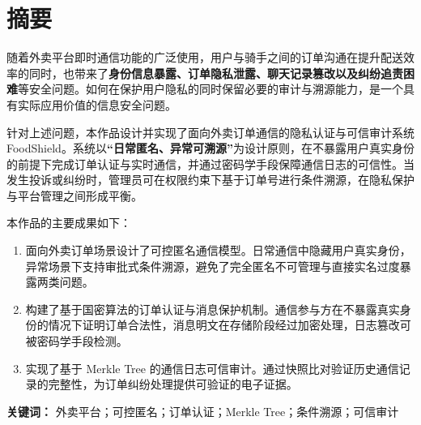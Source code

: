 \section*{摘要}

随着外卖平台即时通信功能的广泛使用，用户与骑手之间的订单沟通在提升配送效率的同时，也带来了\textbf{身份信息暴露、订单隐私泄露、聊天记录篡改以及纠纷追责困难}等安全问题。如何在保护用户隐私的同时保留必要的审计与溯源能力，是一个具有实际应用价值的信息安全问题。

针对上述问题，本作品设计并实现了面向外卖订单通信的隐私认证与可信审计系统 FoodShield。系统以\textbf{“日常匿名、异常可溯源”}为设计原则，在不暴露用户真实身份的前提下完成订单认证与实时通信，并通过密码学手段保障通信日志的可信性。当发生投诉或纠纷时，管理员可在权限约束下基于订单号进行条件溯源，在隐私保护与平台管理之间形成平衡。

本作品的主要成果如下：

\begin{enumerate}[leftmargin=2.5em, itemsep=0pt]
\item 面向外卖订单场景设计了可控匿名通信模型。日常通信中隐藏用户真实身份，异常场景下支持审批式条件溯源，避免了完全匿名不可管理与直接实名过度暴露两类问题。
\item 构建了基于国密算法的订单认证与消息保护机制。通信参与方在不暴露真实身份的情况下证明订单合法性，消息明文在存储阶段经过加密处理，日志篡改可被密码学手段检测。
\item 实现了基于 Merkle Tree 的通信日志可信审计。通过快照比对验证历史通信记录的完整性，为订单纠纷处理提供可验证的电子证据。
\end{enumerate}

\vspace{0.5em}
\noindent\textbf{关键词：} 外卖平台；可控匿名；订单认证；Merkle Tree；条件溯源；可信审计
